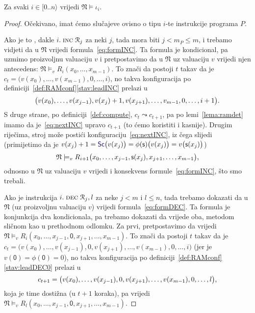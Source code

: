 \begin{lema}[{name=[istinitost instrukcijskih formula u $\mathfrak N$]}]\label{lm:Niotai}
Za svaki $i\in[0..n\rangle$ vrijedi $\mathfrak N\models\iota_i$.
\end{lema}
\begin{proof}
Očekivano, imat ćemo slučajeve ovisno o tipu $i$-te instrukcije programa $P$.

Ako je to \inc, dakle $i.\;\textsc{inc}\;\mathcal R_{j}$ za neki $j$, tada mora biti $j<m_P\le m$, i trebamo vidjeti da u $\mathfrak N$ vrijedi formula~\eqref{eq:formINC}. Ta formula je kondicional, pa uzmimo proizvoljnu valuaciju $v$ i pretpostavimo da u $\mathfrak N$ uz valuaciju $v$ vrijedi njen antecedens: $\mathfrak N\models_v R_i(x_0,\dotsc,x_{m-1})$. To znači da postoji $t$ takav da je $c_t=\bigl(v(x_0),\dotsc,v(x_{m-1}),0,\dotsc,i\bigr)$, no takva konfiguracija po definiciji~\ref{def:RAMconf}\eqref{stav:leadINC} prelazi u
\begin{equation}\label{eq:nextINC}
    \bigl(v(x_0),\dotsc,v(x_{j-1}),v(x_j)+1,v(x_{j+1}),\dotsc,v_{m-1},0,\dotsc,i+1\bigr)\text.
\end{equation}
S druge strane, po definiciji~\ref{def:compute}, $c_t\leadsto c_{t+1}$, pa po lemi~\ref{lema:ramdet} imamo da je~\eqref{eq:nextINC} upravo $c_{t+1}$ (to ćemo koristiti i kasnije). Drugim riječima, stroj može postići konfiguraciju~\eqref{eq:nextINC}, iz čega slijedi (primijetimo da je $v(x_j)+1=\f{Sc}\bigl(v(x_j)\bigr)=\phi(\mathsf s)\bigl(v(x_j)\bigr)=v\bigl(\mathsf s(x_j)\bigr)$)
\begin{equation}
    \mathfrak N\models_v R_{i+1}\bigl(x_0,\dotsc,x_{j-1},\mathsf s(x_j),x_{j+1},\dotsc,x_{m-1}\bigr)\text,
\end{equation}
odnosno u $\mathfrak N$ uz valuaciju $v$ vrijedi i konsekvens formule~\eqref{eq:formINC}, što smo trebali.

Ako je instrukcija $i.\;\textsc{dec}\;\mathcal R_{j},l$ za neke $j<m$ i $l\le n$, tada trebamo dokazati da u $\mathfrak N$ (uz proizvoljnu valuaciju $v$) vrijedi formula~\eqref{eq:formDEC}. Ta formula je konjunkcija dva kondicionala, pa trebamo dokazati da vrijede oba, metodom sličnom kao u prethodnom odlomku. Za prvi, pretpostavimo da vrijedi $\mathfrak N\models_v R_i(x_0,\dotsc,x_{j-1},\mathsf0,x_{j+1},\dotsc,x_{m-1})$. To znači da postoji $t$ takav da je $c_t=\bigl(v(x_0),\dotsc,v(x_{j-1}),0,v(x_{j+1}),\dotsc,v(x_{m-1}),0,\dotsc,i\bigr)$ (jer je $v(\mathsf0)=\phi(\mathsf0)=0$), no takva konfiguracija po definiciji~\ref{def:RAMconf}\eqref{stav:leadDEC0} prelazi u
\begin{equation}
    c_{t+1}=\bigl(v(x_0),\dotsc,v(x_{j-1}),0,v(x_{j+1}),\dotsc,v(x_{m-1}),0,\dotsc,l\bigr)\text,
\end{equation}
koja je time dostižna (u $t+1$ koraka), pa vrijedi $\mathfrak N\models_v R_l(x_0,\dotsc,x_{j-1},\mathsf0,x_{j+1},\dotsc,x_{m-1})$.


\end{proof}

